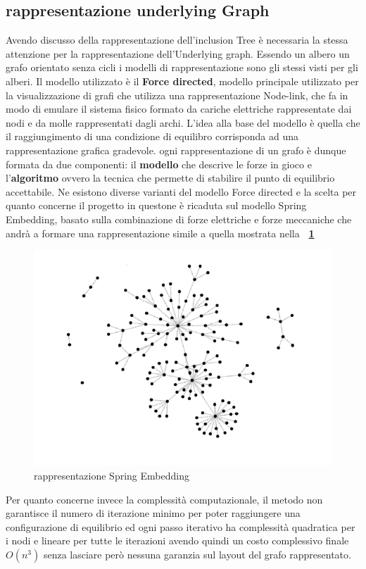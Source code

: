 {\subsection{rappresentazione underlying Graph}
Avendo discusso della rappresentazione dell'inclusion Tree è necessaria la stessa attenzione per la rappresentazione dell'Underlying graph.  Essendo un albero un grafo orientato senza cicli i modelli di rappresentazione sono gli stessi visti per gli alberi. Il modello utilizzato è il \textbf{Force directed}, modello principale utilizzato per la visualizzazione di grafi che utilizza una rappresentazione Node-link, che fa in modo di emulare il sistema fisico formato da cariche elettriche rappresentate dai nodi e da molle rappresentati dagli archi. L'idea alla base del modello è quella che il raggiungimento di una condizione di equilibro corrisponda ad una rappresentazione grafica gradevole. ogni rappresentazione di un grafo è dunque formata da due componenti: il \textbf{modello} che descrive le forze in gioco e l'\textbf{algoritmo} ovvero la tecnica che permette di stabilire il punto di equilibrio accettabile. Ne esistono diverse varianti del modello Force directed e la scelta per quanto concerne il progetto in questone è ricaduta sul modello Spring Embedding, basato sulla combinazione di forze elettriche e forze meccaniche che andrà a formare una rappresentazione simile a quella mostrata nella \textbf{\figurename~\ref{fig:spring}}   
\begin{figure}[!htb]
	\begin{center}
		\includegraphics[width=0.8 \linewidth]{figure/spring}
	\end{center}
	\caption{rappresentazione Spring Embedding\label{fig:spring}}
\end{figure}
Per quanto concerne invece la complessità computazionale, il metodo non garantisce il numero di iterazione minimo per poter raggiungere una configurazione di equilibrio ed ogni passo iterativo ha complessità quadratica per i nodi e lineare per tutte le iterazioni avendo quindi un costo complessivo finale $O(n^3)$ senza lasciare però nessuna garanzia sul layout del grafo rappresentato.

}
